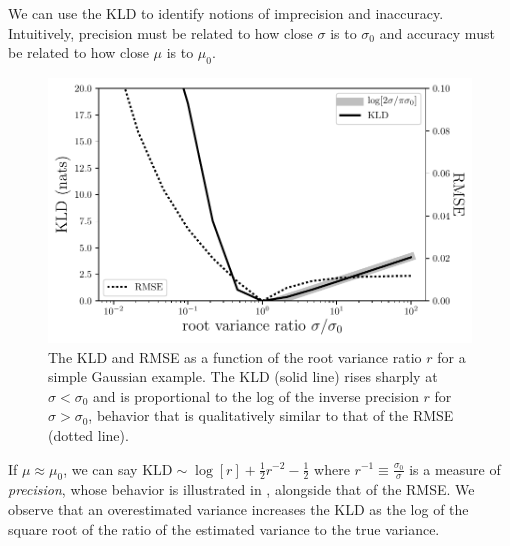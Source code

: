 We can use the KLD to identify notions of imprecision and inaccuracy.
Intuitively, precision must be related to how close $\sigma$ is to $\sigma_{0}$ 
and accuracy must be related to how close $\mu$ is to $\mu_{0}$.

\begin{figure}
	\begin{center}
		\includegraphics[width=0.74\columnwidth]{figures/qp/precision.pdf}
		\caption[The KLD and RMSE as a function of the root variance ratio $r$ for 
		a simple Gaussian example]
		{The KLD and RMSE as a function of the root variance ratio $r$ for 
			a simple Gaussian example.
			The KLD (solid line) rises sharply at $\sigma<\sigma_{0}$ and is 
			proportional to the log of the inverse precision $r$ for $\sigma>\sigma_{0}$, 
			behavior that is qualitatively similar to that of the RMSE (dotted line).
			}
	\end{center}
\end{figure}

If $\mu\approx\mu_{0}$, we can say $\mathrm{KLD}\sim\log[r] + \frac{1}{2}r^{-2} 
- \frac{1}{2}$ where $r^{-1}\equiv\frac{\sigma_{0}}{\sigma}$ is a measure of 
\textit{precision}, whose behavior is illustrated in 
, alongside that of the RMSE.  We observe that an 
overestimated variance increases the KLD as the log of the square root of the 
ratio of the estimated variance to the true variance.

